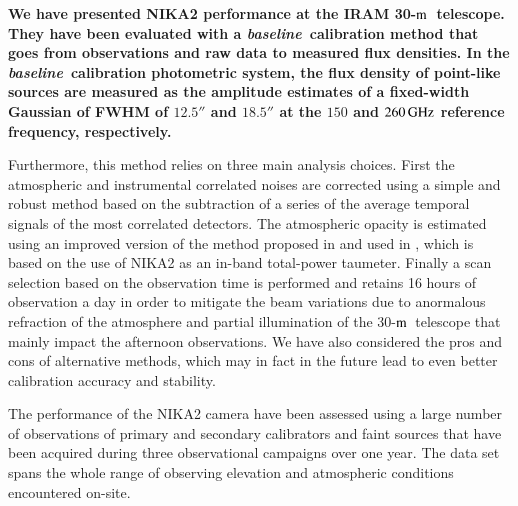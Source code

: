 \documentclass[traditionalabstract]{aa}
\newcommand{\trentemetre}{30-$\rm{m}$}
\newcommand{\baseline}{\emph{baseline}}
\newcommand{\lp}[1]{\bf \color[RGB]{230, 0, 92} #1}
\begin{document}
{\lp We have presented NIKA2 performance at the IRAM
  \trentemetre\ telescope. They have been evaluated with a
  \baseline\ calibration method that goes from
  observations and raw data to measured flux densities.
  In the \baseline\ calibration photometric system, the flux
  density of point-like sources are measured as the amplitude estimates
  of a fixed-width Gaussian of FWHM of $12.5''$ and $18.5''$ at the
$150$ and $260\,\rm{GHz}$ reference frequency,
  respectively.

  Furthermore, this method relies on three main analysis choices. First the
  atmospheric and instrumental correlated noises are corrected using a
  simple and robust method based on the subtraction of a series of
  the average temporal signals of the most correlated detectors. The
  atmospheric opacity is estimated using an improved version of 
  the method proposed in \citet{Catalano2014} and used in
  \citet{Adam2018}, which is based on the use of
  NIKA2 as an in-band total-power taumeter. Finally a scan selection
  based on the observation time is performed and retains 16 hours
  of observation a day in order to mitigate the beam variations due to
  anormalous refraction of the atmosphere and partial illumination of the
  \trentemetre\ telescope that mainly impact the afternoon
  observations. We have also considered the pros and cons of
  alternative methods, which may in fact in the future lead to even
  better calibration accuracy and stability.}

The performance of the NIKA2 camera have been assessed using a large
number of observations of primary and secondary calibrators and faint
sources that have been acquired during three observational campaigns
over one year. The data set spans the whole range of observing
elevation and atmospheric conditions encountered on-site. 
\end{document}
